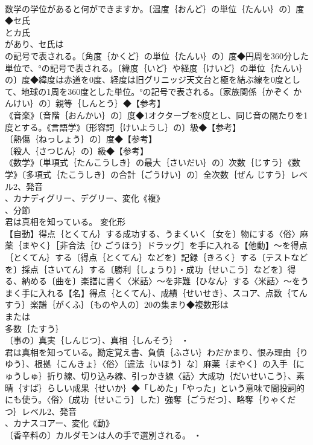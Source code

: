 \documentclass[8pt]{extreport}
\begin{document}
\begin{CJK}{UTF8}{min}
\\	数学の学位があると何ができますか。〔温度｛おんど｝の単位｛たんい｝の〕度◆セ氏
\\	とカ氏
\\	があり、セ氏は
\\	の記号で表される。〔角度｛かくど｝の単位｛たんい｝の〕度◆円周を360分した単位で、°の記号で表される。〔緯度｛いど｝や経度｛けいど｝の単位｛たんい｝の〕度◆緯度は赤道を0度、経度は旧グリニッジ天文台と極を結ぶ線を0度として、地球の1周を360度とした単位。°の記号で表される。〔家族関係｛かぞく かんけい｝の〕親等｛しんとう｝◆【参考】
\\	《音楽》〔音階｛おんかい｝の〕度◆1オクターブを8度とし、同じ音の隔たりを1度とする。《言語学》〔形容詞｛けいようし｝の〕級◆【参考】
\\	〔熱傷｛ねっしょう｝の〕度◆【参考】
\\	〔殺人｛さつじん｝の〕級◆【参考】
\\	《数学》〔単項式｛たんこうしき｝の最大｛さいだい｝の〕次数｛じすう｝《数学》〔多項式｛たこうしき｝の合計｛ごうけい｝の〕全次数｛ぜん じすう｝レベル2、発音
\\	、カナディグリー、デグリー、変化《複》
\\	、分節
\\	君は真相を知っている。	変化形 
\\	【自動】得点｛とくてん｝する成功する、うまくいく〔女を〕物にする〈俗〉麻薬｛まやく｝［非合法｛ひ ごうほう｝ドラッグ］を手に入れる【他動】～を得点｛とくてん｝する〔得点｛とくてん｝などを〕記録｛きろく｝する〔テストなどを〕採点｛さいてん｝する〔勝利｛しょうり｝・成功｛せいこう｝などを〕得る、納める〔曲を〕楽譜に書く〈米話〉～を非難｛ひなん｝する〈米話〉～をうまく手に入れる【名】得点｛とくてん｝、成績｛せいせき｝、スコア、点数｛てんすう｝楽譜｛がくふ｝〔ものや人の〕20の集まり◆複数形は
\\	または
\\	多数｛たすう｝
\\	〔事の〕真実｛しんじつ｝、真相｛しんそう｝ ・
\\	君は真相を知っている。勘定覚え書、負債｛ふさい｝わだかまり、恨み理由｛りゆう｝、根拠｛こんきょ｝〈俗〉〔違法｛いほう｝な〕麻薬｛まやく｝の入手｛にゅうしゅ｝折り線、切り込み線、引っかき線〈話〉大成功｛だいせいこう｝、素晴｛すば｝らしい成果｛せいか｝◆「しめた」「やった」という意味で間投詞的にも使う。〈俗〉〔成功｛せいこう｝した〕強奪｛ごうだつ｝、略奪｛りゃくだつ｝レベル2、発音
\\	、カナスコアー、変化《動》
\\	〔香辛料の〕カルダモンは人の手で選別される。 ・

\end{CJK}
\end{document}
